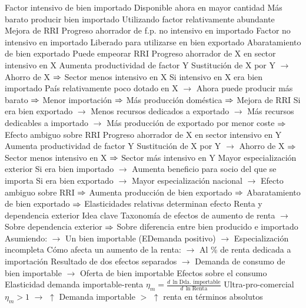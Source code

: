 \documentclass{nuevotema}
\begin{document}
\begin{esquemal}
				\4 Factor intensivo de bien importado
				\4[] Disponible ahora en mayor cantidad
				\4 Más barato producir bien importado
				\4[] Utilizando factor relativamente abundante
				\4[$\then$] Mejora de RRI
			\3 Progreso ahorrador de f.p. no intensivo en importado
				\4 Factor no intensivo en importado
				\4[] Liberado para utilizarse en bien exportado
				\4 Abaratamiento de bien exportado
				\4[$\then$] Puede empeorar RRI
			\3 Progreso ahorrador de X en sector intensivo en X
				\4 Aumenta productividad de factor Y
				\4[] Sustitución de X por Y
				\4[] $\to$ Ahorro de X
				\4[] $\then$ Sector menos intensivo en X
				\4 Si intensivo en X era bien importado
				\4[] País relativamente poco dotado en X
				\4[] $\to$ Ahora puede producir más barato
				\4[] $\then$ Menor importación
				\4[] $\then$ Más producción doméstica
				\4[] $\then$ Mejora de RRI
				\4[] Si era bien exportado
				\4[] $\to$ Menos recursos dedicados a exportado
				\4[] $\to$ Más recursos dedicables a importado
				\4[] $\to$ Más producción de exportado por menor coste
				\4[] $\then$ Efecto ambiguo sobre RRI
			\3 Progreso ahorrador de X en sector intensivo en Y
				\4 Aumenta productividad de factor Y
				\4[] Sustitución de X por Y
				\4[] $\to$ Ahorro de X
				\4[] $\then$ Sector menos intensivo en X
				\4[] $\then$ Sector más intensivo en Y
				\4 Mayor especialización exterior
				\4[] Si era bien importado
				\4[] $\to$ Aumenta beneficio para socio del que se importa
				\4[] Si era bien exportado
				\4[] $\to$ Mayor especialización nacional
				\4[] $\to$ Efecto ambiguo sobre RRI
				\4[] $\then$ Aumenta producción de bien exportado
				\4[] $\then$ Abaratamiento de bien exportado
				\4[] $\then$ Elasticidades relativas determinan efecto
		\2 Renta y dependencia exterior
			\3 Idea clave
				\4[] Taxonomía de efectos de aumento de renta
				\4[] $\to$ Sobre dependencia exterior
				\4[] $\then$ Sobre diferencia entre bien producido e importado
				\4[] Asumiendo:
				\4[] $\to$ Un bien importable (EDemanda positivo)
				\4[] $\to$ Especialización incompleta
				\4[] Cómo afecta un aumento de la renta:
				\4[] $\to$ Al \% de renta dedicada a importación
				\4[] Resultado de dos efectos separados
				\4[] $\to$ Demanda de consumo de bien importable
				\4[] $\to$ Oferta de bien importable
			\3 Efectos sobre el consumo
				\4 Elasticidad demanda importable-renta
				\4[] $\eta_m = \frac{d \, \ln \text{Dda. importable}} {d \, \ln \text{Renta}}$
				\4 Ultra-pro-comercial
				\4[] $\eta_m > 1$
				\4[] $\to$ $\uparrow$ Demanda importable $>$ $\uparrow$ renta en términos absolutos

\end{esquemal}
\end{document}
